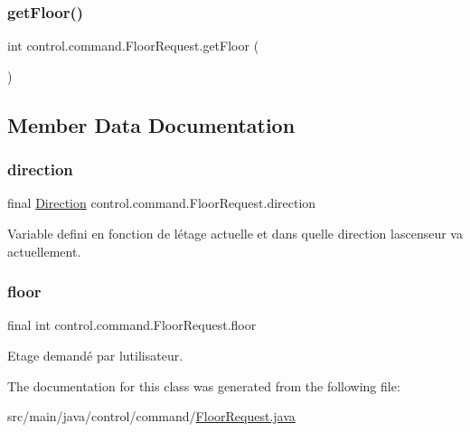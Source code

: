 \mbox{\label{classcontrol_1_1command_1_1_floor_request_a752d0cf165ba8d1033b9d8ca6b4c4d3e}} 
\subsubsection{\texorpdfstring{getFloor()}{getFloor()}}
{\footnotesize\ttfamily int control.\+command.\+Floor\+Request.\+get\+Floor (\begin{DoxyParamCaption}{ }\end{DoxyParamCaption})}



\subsection{Member Data Documentation}
\mbox{\label{classcontrol_1_1command_1_1_floor_request_a0d1e1a3a816acba02789469f4e46a5d1}} 
\subsubsection{\texorpdfstring{direction}{direction}}
{\footnotesize\ttfamily final \mbox{\hyperlink{enumcontrol_1_1command_1_1_direction}{Direction}} control.\+command.\+Floor\+Request.\+direction\hspace{0.3cm}{\ttfamily [private]}}



Variable defini en fonction de l\textquotesingle{}étage actuelle et dans quelle direction l\textquotesingle{}ascenseur va actuellement. 

\mbox{\label{classcontrol_1_1command_1_1_floor_request_a8cac00f900db9272c0e6971e0327075f}} 
\subsubsection{\texorpdfstring{floor}{floor}}
{\footnotesize\ttfamily final int control.\+command.\+Floor\+Request.\+floor\hspace{0.3cm}{\ttfamily [private]}}



Etage demandé par l\textquotesingle{}utilisateur. 



The documentation for this class was generated from the following file\+:\begin{DoxyCompactItemize}
\item 
src/main/java/control/command/\mbox{\hyperlink{_floor_request_8java}{Floor\+Request.\+java}}\end{DoxyCompactItemize}
